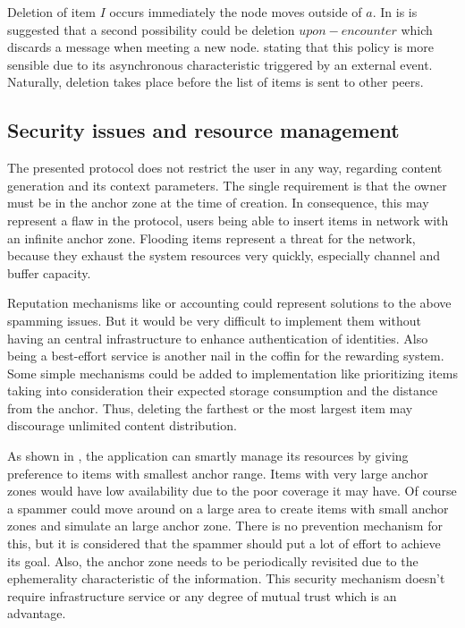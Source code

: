 Deletion of item $I$ occurs immediately the node moves outside of $a$. In
\cite{percomfloatingcontent} is is suggested that a second possibility could be
deletion $upon-encounter$ which discards a message when meeting a new node.
stating that this policy is more sensible due to its asynchronous
characteristic triggered by an external event. Naturally, deletion takes place
before the list of items is sent to other peers.

\subsection{Security issues and resource management}

The presented protocol does not restrict the user in any way, regarding content
generation and its context parameters. The single requirement is that the owner
must be in the anchor zone at the time of creation. In consequence, this may
represent a flaw in the protocol, users being able to insert items in network
with an infinite anchor zone. Flooding items represent a threat for the network,
because they exhaust the system resources very quickly, especially channel and
buffer capacity.

Reputation mechanisms like \cite{reputation} or accounting could represent
solutions to the above spamming issues. But it would be very difficult to
implement them without having an central infrastructure to enhance
authentication of identities. Also being a best-effort service is another nail
in the coffin for the rewarding system. Some simple mechanisms could be added to
implementation like prioritizing items taking into consideration their expected
storage consumption and the distance from the anchor. Thus, deleting the
farthest or the most largest item may discourage unlimited content distribution.

As shown in \cite{percomfloatingcontent}, the application can smartly manage its
resources by giving preference to items with smallest anchor range. Items with
very large anchor zones would have low availability due to the poor coverage it
may have. Of course a spammer could move around on a large area to create items
with small anchor zones and simulate an large anchor zone. There is no
prevention mechanism for this, but it is considered that the spammer should put
a lot of effort to achieve its goal. Also, the anchor zone needs to be
periodically revisited due to the ephemerality characteristic of the
information.
This security mechanism doesn't require infrastructure service or any degree of
mutual trust which is an advantage.


